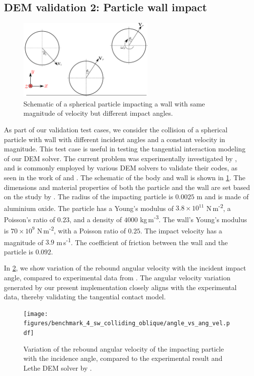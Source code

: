\documentclass[preprint,12pt]{elsarticle}
\begin{document}
\subsection{DEM validation 2: Particle wall impact}
\label{sec:DEM_validation_2_particle_wall_impact}
\begin{figure}[!htpb]
  \centering
  \includegraphics[width=0.6\textwidth]{images/results_dem_2_validation_particle_wall_impact/schematic}
  \caption{Schematic of a spherical particle impacting a wall
    with same magnitude of velocity but different impact angles.}
  \label{fig:result:dem_sw_contact_schematic}
\end{figure}
As part of our validation test cases, we consider the collision of a spherical
particle with wall with different incident angles and a constant velocity in
magnitude. This test case is useful in testing the tangential interaction
modeling of our DEM solver.  The current problem was experimentally
investigated by \citet{kharaz2001experimental}, and is commonly employed by
various DEM solvers to validate their codes, as seen in the work of
\cite{di2004comparison} and \cite{golshan2023lethe}.  The schematic of the
body and wall is shown in \cref{fig:result:dem_sw_contact_schematic}.
The dimensions and material properties of both the particle and the wall are
set based on the study by \cite{di2004comparison,kharaz2001experimental}. The
radius of the impacting particle is $0.0025$ m and is made of aluminium
oxide. The particle has a Young's modulus of $3.8 \times 10^{11}$
N\,m\textsuperscript{-2}, a Poisson's ratio of $0.23$, and a density of $4000$
kg\,m\textsuperscript{-3}. The wall's Young's modulus is $70\times 10^{9}$
N\,m\textsuperscript{-2}, with a Poisson ratio of $0.25$.  The impact velocity
has a magnitude of $3.9$ m\,s\textsuperscript{-1}. The coefficient of friction
between the wall and the particle is $0.092$.


In \cref{fig:result:dem_sw_contact_omega_vs_theta}, we show variation of the
rebound angular velocity with the incident impact angle, compared to
experimental data from \citet{kharaz2001experimental}.  The angular velocity
variation generated by our present implementation closely aligns with the
experimental data, thereby validating the tangential
contact model.
\begin{figure}[!htpb]
  \centering
  \texttt{[image: figures/benchmark\_4\_sw\_colliding\_oblique/angle\_vs\_ang\_vel.pdf]}
  \caption{Variation of the rebound angular velocity of the impacting particle
    with the incidence angle, compared to the experimental result and Lethe
    DEM solver by \cite{golshan2023lethe}.}
  \label{fig:result:dem_sw_contact_omega_vs_theta}
\end{figure}
\end{document}
